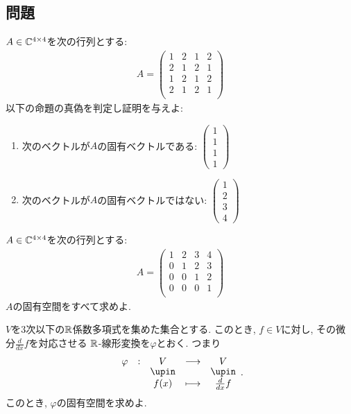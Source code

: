\subsection{問題}
\begin{quiz}
  $A\in \mathbb{C}^{4\times 4}$を次の行列とする:
  \begin{align*}
    A=
    \begin{pmatrix}
      1&2&1&2\\
      2&1&2&1\\
      1&2&1&2\\
      2&1&2&1\\
    \end{pmatrix}
  \end{align*}
  以下の命題の真偽を判定し証明を与えよ:
  \begin{enumerate}
  \item 次のベクトルが$A$の固有ベクトルである:
      $\begin{pmatrix}1\\1\\1\\1\end{pmatrix}$
  \item 次のベクトルが$A$の固有ベクトルではない:
      $\begin{pmatrix}1\\2\\3\\4\end{pmatrix}$
  \end{enumerate}
\end{quiz}

\begin{quiz}
  $A\in \mathbb{C}^{4\times 4}$を次の行列とする:
  \begin{align*}
    A=
    \begin{pmatrix}
      1&2&3&4\\
      0&1&2&3\\
      0&0&1&2\\
      0&0&0&1\\
    \end{pmatrix}
  \end{align*}
  $A$の固有空間をすべて求めよ.
\end{quiz}


\begin{quiz}
  $V$を$3$次以下の$\mathbb{R}$係数多項式を集めた集合とする.
  このとき,
  $f\in V$に対し, その微分$\frac{d}{dx}f$を対応させる
  $\mathbb{R}$-線形変換を$\varphi$とおく. つまり
  \begin{align*}
    \shazo{\varphi}{V}{V}
    {f(x)}{\frac{d}{dx}f}.
  \end{align*}
  このとき,
  $\varphi$の固有空間を求めよ.
\end{quiz}

